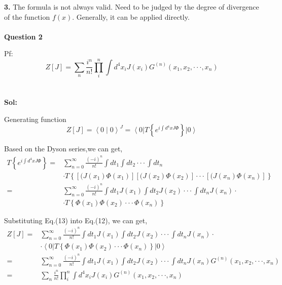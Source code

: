 \documentclass[a4paper]{article}
\begin{document}
\par\textbf{3.} The formula is not always valid. Need to be judged by the degree of divergence of the function $f(x)$. Generally, it can be applied directly.
\\
\\
\noindent \textbf{Question 2}
\par Pf:
\begin{equation}
    Z[J]=\sum_n{\frac{i^n}{n!}}\prod_{i}^{n}{\int{d
    ^4x_{i}J(x_{i})G^{(n)}(x_{1},x_{2},\cdot\cdot\cdot,x_{n})}}
\end{equation} 
\\ \\
\textbf{Sol:}
\par Generating function
\begin{equation}
Z[J]=\left<0\mid0\right>^J=\left<0\right|T\left\{e^{i\int{d^4xJ\varPhi}}\right\}\left|0\right>
\end{equation}
\par Based on the Dyson series,we can get,
\begin{equation}
\begin{split}
    T\left\{e^{i\int{d^4xJ\varPhi}}\right\}
    =&\sum_{n=0}^{\infty}{\frac{(-i)^n}{n!}\int{dt_{1}}\int{dt_{2}}\cdot\cdot\cdot\int{dt_{n}}}
    \\
    &\cdot{T\left\{[(J(x_{1})\varPhi(x_{1})][(J(x_{2})\varPhi(x_{2})]\cdot\cdot\cdot[(J(x_{n})\varPhi(x_{n})]\right\}}\\
    =&\sum_{n=0}^{\infty}{\frac{(-i)^n}{n!}\int{dt_{1}J(x_{1})}\int{dt_{2}J(x_{2})}\cdot\cdot\cdot\int{dt_{n}}J(x_{n})}
    \cdot\\
    &\cdot{T\left\{\varPhi(x_{1})\varPhi(x_{2})\cdot\cdot\cdot\varPhi(x_{n})\right\}}
\end{split}
\end{equation}
\par Substituting Eq.(13) into Eq.(12), we can get,
\begin{equation}
\begin{split}
    Z[J]=&\sum_{n=0}^{\infty}{\frac{(-i)^n}{n!}\int{dt_{1}J(x_{1})}\int{dt_{2}J(x_{2})}\cdot\cdot\cdot\int{dt_{n}}J(x_{n})}
    \cdot\\
    &\cdot\left<0\right|{T\left\{\varPhi(x_{1})\varPhi(x_{2})\cdot\cdot\cdot\varPhi(x_{n})\right\}}\left|0\right>\\
    =&\sum_{n=0}^{\infty}{\frac{(-i)^n}{n!}\int{dt_{1}J(x_{1})}\int{dt_{2}J(x_{2})}\cdot\cdot\cdot\int{dt_{n}}J(x_{n})G^{(n)}(x_{1},x_{2},\cdot\cdot\cdot,x_{n})}\\
    =&\sum_n{\frac{i^n}{n!}}\prod_{i}^{n}{\int{d
    ^4x_{i}J(x_{i})G^{(n)}(x_{1},x_{2},\cdot\cdot\cdot,x_{n})}}
\end{split}
\end{equation}
\end{document}
